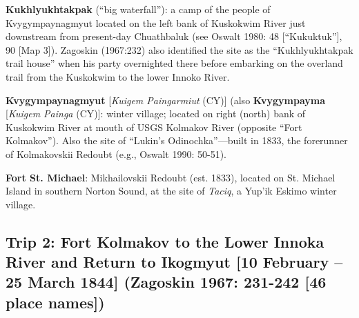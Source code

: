 \begin{hang}
\textbf{Kukhlyukhtakpak} (“big waterfall”): a camp of the people of Kvygympaynagmyut located on the left bank of Kuskokwim River just downstream from present-day Chuathbaluk (see Oswalt 1980: 48 [“Kukuktuk”], 90 [Map 3]). Zagoskin (1967:232) also identified the site as the “Kukhlyukhtakpak trail house” when his party overnighted there before embarking on the overland trail from the Kuskokwim to the lower Innoko River.



\textbf{Kvygympaynagmyut} [\textit{Kuigem Paingarmiut} (CY)] (also \textbf{Kvygympayma} [\textit{Kuigem Painga} (CY)]: winter village; located on right (north) bank of Kuskokwim River at mouth of USGS Kolmakov River (opposite “Fort Kolmakov”). Also the site of “Lukin’s Odinochka”—built in 1833, the forerunner of Kolmakovskii Redoubt (e.g., Oswalt 1990: 50-51).



\textbf{Fort St. Michael}: Mikhailovskii Redoubt (est. 1833), located on St. Michael Island in southern Norton Sound, at the site of \textit{Taciq}, a Yup’ik Eskimo winter village.

\end{hang}


\subsection*{Trip 2: Fort Kolmakov to the Lower Innoka River and Return to Ikogmyut [10 February – 25 March 1844] (Zagoskin 1967: 231-242 [46 place names])}


